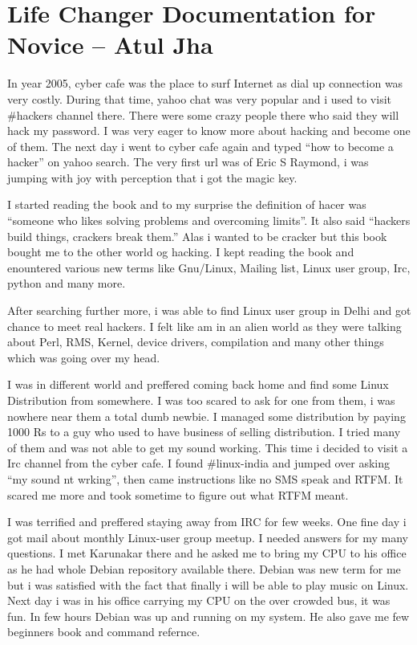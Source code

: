 \chapter{Life Changer Documentation for Novice -- Atul Jha}
In year 2005, cyber cafe was the place to surf Internet as dial up connection was very costly. During that time, yahoo chat was very popular and i used to visit \#hackers channel there. There were some crazy people there who said they will hack my password. I was very eager to know more about hacking and become one of them. The next day i went to cyber cafe again and typed “how to become a hacker” on yahoo search. The very first url was of Eric S Raymond, i was jumping with joy with perception that i got the magic key.
 
I started reading the book and to my surprise the definition of hacer was “someone who likes solving problems and overcoming limits”. It also said “hackers build things, crackers break them.”  Alas i wanted to be cracker but this book bought me to the other world og hacking. I kept reading the book and enountered various new terms like Gnu/Linux, Mailing list, Linux user group, Irc, python and many more. 

After searching further more, i was able to find Linux user group in Delhi and got chance to meet real hackers. I felt like am in an alien world as they were talking about Perl, RMS, Kernel, device drivers, compilation and many other things which was going over my head.  

I was in different world and preffered coming back home and find some Linux Distribution from somewhere. I was too scared to ask for one from them, i was nowhere near them a total dumb newbie. I managed some distribution by paying 1000 Rs to a guy who used to have business of selling distribution. I tried many of them and was not able to get my sound working. This time i decided to visit a Irc channel from the cyber cafe. I found \#linux-india and jumped over asking “my sound nt wrking”, then came instructions like no SMS speak and RTFM. It scared me more and took sometime to figure out what RTFM meant. 

I was terrified and preffered staying away from IRC for few weeks. One fine day i got mail about monthly Linux-user group meetup. I needed answers for my many questions. I met Karunakar there and he asked me to bring my CPU to his office as he had whole Debian repository available there. Debian was new term for me but i was satisfied with the fact that finally i will be able to play music  on Linux.  Next day i was in his office carrying my CPU on the over crowded bus, it was fun. In few hours Debian was up and running on my system. He also gave me few beginners book and command refernce. 

